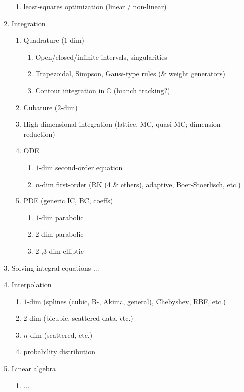 \documentclass[10pt,dvipdfmx,letterpaper,twoside]{article}
\newcommand{\CC}{{\mathbb{C}}}
\begin{document}
\begin{enumerate}
\begin{enumerate}
  \item least-squares optimization (linear / non-linear)
  \end{enumerate}
\item Integration
  \begin{enumerate}
  \item Quadrature ($1$-dim)
    \begin{enumerate}
    \item Open/closed/infinite intervals, singularities
    \item Trapezoidal, Simpson, Gauss-type rules (\& weight generators)
    \item Contour integration in $\CC$ (branch tracking?)
    \end{enumerate}
  \item Cubature ($2$-dim)
  \item High-dimensional integration (lattice, MC, quasi-MC; dimension reduction)
  \item ODE
    \begin{enumerate}
    \item $1$-dim second-order equation
    \item $n$-dim first-order (RK (4 \& others), adaptive, Boer-Stoerlisch, etc.)
    \end{enumerate}
  \item PDE (generic IC, BC, coeffs)
    \begin{enumerate}
    \item $1$-dim parabolic
    \item $2$-dim parabolic
    \item $2$-,$3$-dim elliptic
    \end{enumerate}
  \end{enumerate}
  \item Solving integral equations ...
\item Interpolation
  \begin{enumerate}
  \item $1$-dim (splines (cubic, B-, Akima, general), Chebyshev, RBF, etc.)
  \item $2$-dim (bicubic, scattered data, etc.)
  \item $n$-dim (scattered, etc.)
  \item probability distribution
  \end{enumerate}
\item Linear algebra
  \begin{enumerate}
  \item ...
  \end{enumerate}
\end{enumerate}
\end{document}
